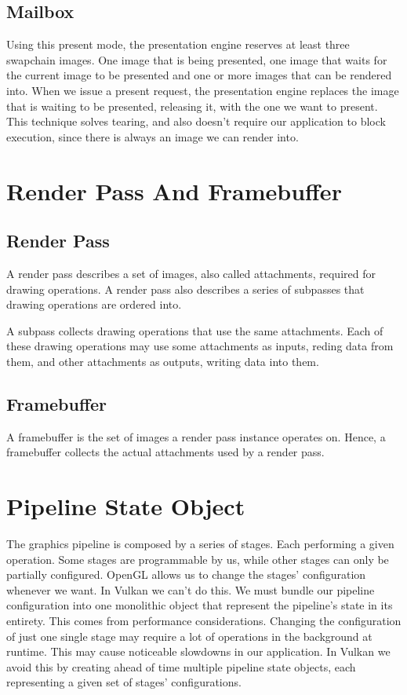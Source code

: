 \subsection{Mailbox}

Using this present mode, the presentation engine reserves at least three
swapchain images.
One image that is being presented, one image that waits for the current image
to be presented and one or more images that can be rendered into.
When we issue a present request, the presentation engine replaces the
image that is waiting to be presented, releasing it, with the one we want
to present.
This technique solves tearing, and also doesn't require our application to
block execution, since there is always an image we can render into.

\section{Render Pass And Framebuffer}

\subsection{Render Pass}

A render pass describes a set of images, also called attachments, required
for drawing operations.
A render pass also describes a series of subpasses that drawing operations
are ordered into.

A subpass collects drawing operations that use the same attachments.
Each of these drawing operations may use some attachments as inputs,
reding data from them, and other attachments as outputs, writing data into them.

\subsection{Framebuffer}

A framebuffer is the set of images a render pass instance operates on.
Hence, a framebuffer collects the actual attachments used by a render pass.

\section{Pipeline State Object}

The graphics pipeline is composed by a series of stages.
Each performing a given operation.
Some stages are programmable by us, while other stages can only be
partially configured.
OpenGL allows us to change the stages' configuration whenever we want.
In Vulkan we can't do this.
We must bundle our pipeline configuration into one monolithic object
that represent the pipeline's state in its entirety.
This comes from performance considerations.
Changing the configuration of just one single stage may require a lot of
operations in the background at runtime.
This may cause noticeable slowdowns in our application.
In Vulkan we avoid this by creating ahead of time multiple pipeline state
objects, each representing a given set of stages' configurations.


